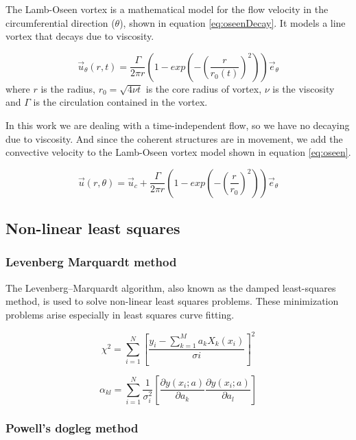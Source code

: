 \documentclass[12pt, a4paper, openany]{memoir}
\begin{document}
The Lamb-Oseen vortex is a mathematical model for the flow velocity in the circumferential direction ($\theta$), shown in equation \ref{eq:oseenDecay}. It models a line vortex that decays due to viscosity.

\begin{equation}
\label{eq:oseenDecay}
\vec{u}_\theta(r,t) = \frac{\Gamma}{2\pi r} \left( 1 - exp \left( -\left(\frac{r}{r_0(t)}\right)^2\right)\right) \vec{e}_{\theta}
\end{equation}
where $r$ is the radius, $r_0 = \sqrt{4 \nu t}$ is the core radius of vortex, $\nu$ is the viscosity and $\Gamma$ is the circulation contained in the vortex. 

In this work we are dealing with a time-independent flow, so we have no decaying due to viscosity. And since the coherent structures are in movement, we add the convective velocity to the Lamb-Oseen vortex model shown in equation \ref{eq:oseen}.  

\begin{equation}
\label{eq:oseen}
\vec{u}(r,\theta) = \vec{u}_c + \frac{\Gamma}{2\pi r} \left( 1 - exp \left( -\left(\frac{r}{r_0}\right)^2\right)\right) \vec{e}_{\theta}
\end{equation}

\subsection{Non-linear least squares}

\subsubsection{Levenberg Marquardt method}

The Levenberg–Marquardt algorithm, also known as the damped least-squares method, is used to solve non-linear least squares problems. These minimization problems arise especially in least squares curve fitting.

\begin{equation}
\chi^2 = \sum_{i=1}^N \left[ \frac{y_i - \sum_{k=1}^M a_k X_k (x_i)}{\sigma i} \right]^2
\end{equation}

\begin{equation}
\alpha_{kl} = \sum_{i=1}^N \frac{1}{\sigma_i^2} \left[ \frac{\partial y(x_i;a)}{\partial a_k} \frac{\partial y(x_i;a)}{\partial a_l} \right]
\end{equation}

\subsubsection{Powell's dogleg method}
\end{document}
